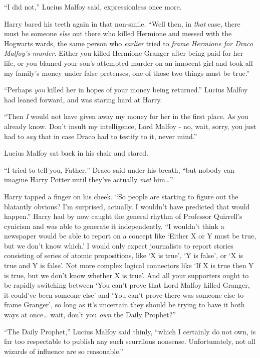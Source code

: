 ``I did not,'' Lucius Malfoy said, expressionless once more.

Harry bared his teeth again in that non-smile. ``Well then, in
\emph{that} case, there must be someone \emph{else} out there who killed
Hermione and messed with the Hogwarts wards, the same person who
\emph{earlier} tried to \emph{frame Hermione for Draco Malfoy's murder.}
Either you killed Hermione Granger after being paid for her life, or you
blamed your son's attempted murder on an innocent girl and took all my
family's money under false pretenses, one of those two things must be
true.''

``Perhaps \emph{you} killed her in hopes of your money being returned.''
Lucius Malfoy had leaned forward, and was staring hard at Harry.

``Then \emph{I} would not have given away my money for her in the first
place. As you already know. Don't insult my intelligence, Lord Malfoy -
no, wait, sorry, you just had to \emph{say} that in case Draco had to
testify to it, never mind.''

Lucius Malfoy sat back in his chair and stared.

``I tried to tell you, Father,'' Draco said under his breath, ``but
nobody can imagine Harry Potter until they've actually \emph{met}
him\ldots{}''

Harry tapped a finger on his cheek. ``So people are starting to figure
out the blatantly obvious? I'm surprised, actually. I wouldn't have
predicted that would happen.'' Harry had by now caught the general
rhythm of Professor Quirrell's cynicism and was able to generate it
independently. ``I wouldn't think a newspaper would be able to report on
a concept like `Either X or Y must be true, but we don't know which.' I
would only expect journalists to report stories consisting of series of
atomic propositions, like `X is true', `Y is false', or `X is true and Y
is false'. Not more complex logical connectors like `If X is true then Y
is true, but we don't know whether X is true'. And all your supporters
ought to be rapidly switching between `You can't prove that Lord Malfoy
killed Granger, it could've been someone else' and `You can't prove
there was someone else to frame Granger', so long as it's uncertain they
should be trying to have it both ways at once\ldots{} wait, don't you
\emph{own} the Daily Prophet?''

``The Daily Prophet,'' Lucius Malfoy said thinly, ``which I certainly do
not own, is far too respectable to publish any such scurrilous nonsense.
Unfortunately, not all wizards of influence are so reasonable.''

